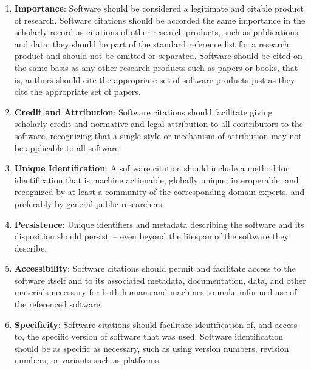 \documentclass[11pt, oneside]{amsart}
\begin{document}
\begin{enumerate}
\item \textbf{Importance}: \label{principle:importance} Software should be
considered a legitimate and citable product of research. Software citations should
be accorded the same importance in the scholarly record as citations of other
research products, such as publications and data; they should be part of the
standard reference list for a research product and should not be omitted or separated.
Software should be cited on the same basis as any other research products such as
papers or books, that is, authors should cite the appropriate set of software
products just as they cite the appropriate set of papers.

\item \textbf{Credit and Attribution}: \label{principle:credit}
Software citations should facilitate giving scholarly credit and normative
and legal attribution to all contributors to the software, recognizing
that a single style or mechanism of attribution may not be applicable to
all software.

\item \textbf{Unique Identification}: \label{principle:uid}
A software citation should include a method for identification that is
machine actionable, globally unique, interoperable, and recognized by
at least a community of the corresponding domain experts, and preferably by 
general public researchers.

\item \textbf{Persistence}: \label{principle:persistence}
Unique identifiers and metadata describing the software and its disposition
should persist~-- even beyond the lifespan of the software they describe.

\item \textbf{Accessibility}: \label{principle:accessibility} Software citations
should permit and facilitate access to the software itself and to its
associated metadata, documentation, data, and other materials necessary
for both humans and machines to make informed use of the referenced software.

\item \textbf{Specificity}: Software citations should facilitate identification
of, and access to, the specific version of software that was used. Software
identification should be as specific as necessary, such as using version
numbers, revision numbers, or variants such as platforms.
\end{enumerate}
\end{document}
